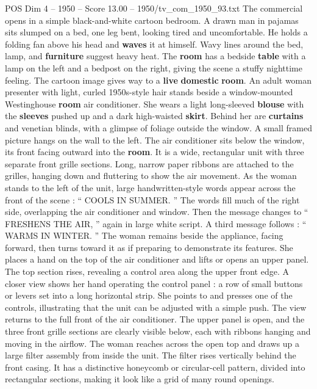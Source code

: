 \begin{textsample}{POS Dim 4 – 1950 – Score 13.00 – 1950/tv\_com\_1950\_93.txt}  \label{ex:f4_pos_039}
The commercial opens in a simple black-and-white cartoon bedroom.
A drawn man in pajamas sits slumped on a bed, one leg bent, looking tired and uncomfortable.
He holds a folding fan above his head and \textbf{waves} it at himself.
Wavy lines around the bed, lamp, and \textbf{furniture} suggest heavy heat.
The \textbf{room} has a bedside \textbf{table} with a lamp on the left and a bedpost on the right, giving the scene a stuffy nighttime feeling.
The cartoon image gives way to a \textbf{live} \textbf{domestic} \textbf{room}.
An adult woman presenter with light, curled 1950s-style hair stands beside a window-mounted Westinghouse \textbf{room} air conditioner.
She wears a light long-sleeved \textbf{blouse} with the \textbf{sleeves} pushed up and a dark high-waisted \textbf{skirt}.
Behind her are \textbf{curtains} and venetian blinds, with a glimpse of foliage outside the window.
A small framed picture hangs on the wall to the left.
The air conditioner sits below the window, its front facing outward into the \textbf{room}.
It is a wide, rectangular unit with three separate front grille sections.
Long, narrow paper ribbons are attached to the grilles, hanging down and fluttering to show the air movement.
As the woman stands to the left of the unit, large handwritten-style words appear across the front of the scene : “ COOLS IN SUMMER. ” The words fill much of the right side, overlapping the air conditioner and window.
Then the message changes to “ FRESHENS THE AIR, ” again in large white script.
A third message follows : “ WARMS IN WINTER. ” The woman remains beside the appliance, facing forward, then turns toward it as if preparing to demonstrate its features.
She places a hand on the top of the air conditioner and lifts or opens an upper panel.
The top section rises, revealing a control area along the upper front edge.
A closer view shows her hand operating the control panel : a row of small buttons or levers set into a long horizontal strip.
She points to and presses one of the controls, illustrating that the unit can be adjusted with a simple push.
The view returns to the full front of the air conditioner.
The upper panel is open, and the three front grille sections are clearly visible below, each with ribbons hanging and moving in the airflow.
The woman reaches across the open top and draws up a large filter assembly from inside the unit.
The filter rises vertically behind the front casing.
It has a distinctive honeycomb or circular-cell pattern, divided into rectangular sections, making it look like a grid of many round openings.

\end{textsample}
